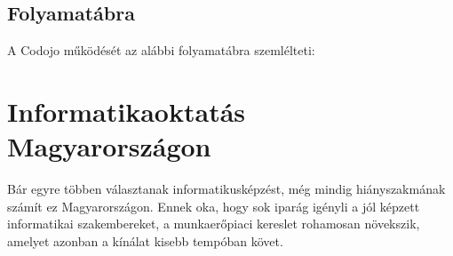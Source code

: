 \documentclass{thesis-ekf}
\begin{document}
	\section{Folyamatábra}
	A Codojo működését az alábbi folyamatábra szemlélteti:
	
	\begin{figure}[htb]
		\begin{floatrow}
		\end{floatrow}
	\end{figure}

\chapter{Informatikaoktatás Magyarországon}
Bár egyre többen választanak informatikusképzést, még mindig hiányszakmának számít ez Magyarországon. Ennek oka, hogy sok iparág igényli a jól képzett informatikai szakembereket, a munkaerőpiaci kereslet rohamosan növekszik, amelyet azonban a kínálat kisebb tempóban követ.
\end{document}

